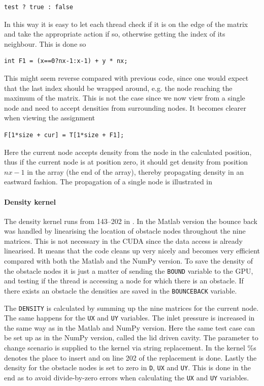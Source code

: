 \begin{verbatim}
test ? true : false
\end{verbatim}

In this way it is easy to let each thread check if it is on the edge of the matrix and take the appropriate action if so, otherwise getting the index of its neighbour. This is done so

\begin{verbatim}
int F1 = (x==0?nx-1:x-1) + y * nx;
\end{verbatim}

This might seem reverse compared with previous code, since one would expect that the last index should be wrapped around, e.g. the node reaching the maximum of the matrix. This is not the case since we now view from a single node and need to accept densities from surrounding nodes. It becomes clearer when viewing the assignment

\begin{verbatim}
F[1*size + cur] = T[1*size + F1];
\end{verbatim}

Here the current node accepts density from the node in the calculated position, thus if the current node is at position zero, it should get density from position $nx-1$ in the array (the end of the array), thereby propagating density in an eastward fashion. The propagation of a single node is illustrated in 


\paragraph{Density kernel}
The density kernel runs from 143--202 in . In the Matlab version the bounce back was handled by linearising the location of obstacle nodes throughout the nine matrices. This is not necessary in the CUDA since the data access is already linearised. It means that the code cleans up very nicely and becomes very efficient compared with both the Matlab and the NumPy version. To save the density of the obstacle nodes it is just a matter of sending the \texttt{BOUND} variable to the GPU, and testing if the thread is accessing a node for which there is an obstacle. If there exists an obstacle the densities are saved in the \texttt{BOUNCEBACK} variable.

The \texttt{DENSITY} is calculated by summing up the nine matrices for the current node. The same happens for the \texttt{UX} and \texttt{UY} variables. The inlet pressure is increased in the same way as in the Matlab and NumPy version. Here the same test case can be set up as in the NumPy version, called the lid driven cavity. The parameter to change scenario is supplied to the kernel via string replacement. In the kernel \%s denotes the place to insert and on line 202 of  the replacement is done. Lastly the density for the obstacle nodes is set to zero in \texttt{D}, \texttt{UX} and \texttt{UY}. This is done in the end as to avoid divide-by-zero errors when calculating the \texttt{UX} and \texttt{UY} variables.


